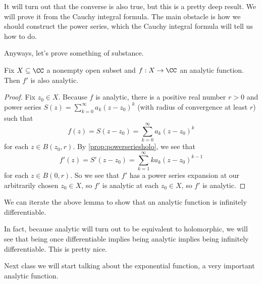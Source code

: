 \begin{remark}
	It will turn out that the converse is also true, but this is a pretty deep result. We will prove it from the Cauchy integral formula. The main obstacle is how we should construct the power series, which the Cauchy integral formula will tell us how to do.
\end{remark}
Anyways, let's prove something of substance.
\begin{lemma}
	Fix $X\subseteq\CC$ a nonempty open subset and $f:X\to\CC$ an analytic function. Then $f'$ is also analytic.
\end{lemma}
\begin{proof}
	Fix $z_0\in X$. Because $f$ is analytic, there is a positive real number $r>0$ and power series $S(z)=\sum_{k=0}^\infty a_k(z-z_0)^k$ (with radius of convergence at least $r$) such that
	\[f(z)=S(z-z_0)=\sum_{k=0}^\infty a_k(z-z_0)^k\]
	for each $z\in B(z_0,r)$. By \autoref{prop:powerseriesholo}, we see that
	\[f'(z)=S'(z-z_0)=\sum_{k=1}^\infty ka_k(z-z_0)^{k-1}\]
	for each $z\in B(0,r)$. So we see that $f'$ has a power series expansion at our arbitrarily chosen $z_0\in X$, so $f'$ is analytic at each $z_0\in X$, so $f'$ is analytic.
\end{proof}
\begin{remark}
	We can iterate the above lemma to show that an analytic function is infinitely differentiable.
\end{remark}
\begin{remark}
	In fact, because analytic will turn out to be equivalent to holomorphic, we will see that being once differentiable implies being analytic implies being infinitely differentiable. This is pretty nice.
\end{remark}
Next class we will start talking about the exponential function, a very important analytic function.